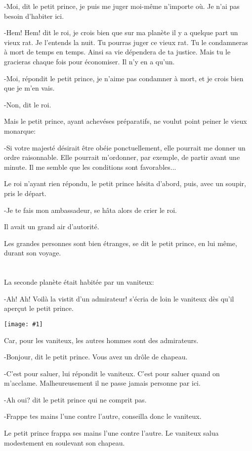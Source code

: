 \documentclass{report}
\newcommand{\parachapter}[2][]{\end{paracol}\chapter[#1]{#2}\begin{paracol}{2}}
\newcommand{\incpic}[1]{%
\end{paracol}
\begin{center}
    \texttt{[image: \#1]}
\end{center}
\begin{paracol}{2}}
\begin{document}
\begin{paracol}{2}
-Moi, dit le petit prince, je puis me juger moi-même n'importe où. Je n'ai pas besoin d'habiter ici.

-Hem! Hem! dit le roi, je crois bien que sur ma planète il y a quelque part un vieux rat. Je l'entends la nuit. Tu pourras juger ce vieux rat. Tu le condamneras à mort de temps en temps. Ainsi sa vie dépendera de ta justice. Mais tu le gracieras chaque fois pour économiser. Il n'y en a qu'un.

-Moi, répondit le petit prince, je n'aime pas condamner à mort, et je crois bien que je m'en vais.

-Non, dit le roi.

Mais le petit prince, ayant achevéses préparatifs, ne voulut point peiner le vieux monarque:

-Si votre majesté désirait être obéie ponctuellement, elle pourrait me donner un ordre raisonnable. Elle pourrait m'ordonner, par exemple, de partir avant une minute. Il me semble que les conditions sont favorables...

Le roi n'ayant rien répondu, le petit prince hésita d'abord, puis, avec un soupir, pris le départ.

-Je te fais mon ambassadeur, se hâta alors de crier le roi.

Il avait un grand air d'autorité.

Les grandes personnes sont bien étranges, se dit le petit prince, en lui même, durant son voyage.

\parachapter{} %

La seconde planète était habitée par un vaniteux:

-Ah! Ah! Voilà la vistit d'un admirateur! s'écria de loin le vaniteux dès qu'il aperçut le petit prince. 

\incpic{pic/image26.jpeg}

Car, pour les vaniteux, les autres hommes sont des admirateurs.

-Bonjour, dit le petit prince. Vous avez un drôle de chapeau.

-C'est pour saluer, lui répondit le vaniteux. C'est pour saluer quand on m'acclame. Malheureusement il ne passe jamais personne par ici.

-Ah oui? dit le petit prince qui ne comprit pas.

-Frappe tes mains l'une contre l'autre, conseilla donc le vaniteux.

Le petit prince frappa ses mains l'une contre l'autre. Le vaniteux salua modestement en soulevant son chapeau.


\end{paracol}
\end{document}
